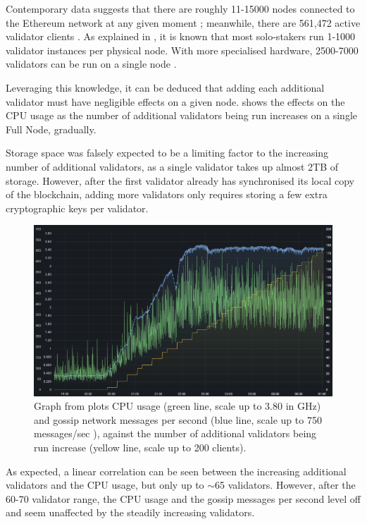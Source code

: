 Contemporary data suggests that there are roughly 11-15000 nodes connected to the Ethereum network at any given moment \cite{NodewatchAnalytics}; meanwhile, there are 561,472 active validator clients \cite{EthereumEthereum.orgc}. As explained in , it is known that most solo-stakers run 1-1000 validator instances per physical node. With more specialised hardware, 2500-7000 validators can be run on a single node \cite{Kaushal2022ValidatingConference}. 

Leveraging this knowledge, it can be deduced that adding each additional validator must have negligible effects on a given node.  shows the effects on the CPU usage as the number of additional validators being run increases on a single Full Node, gradually.

Storage space was falsely expected to be a limiting factor to the increasing number of additional validators, as a single validator takes up almost 2TB of storage. However, after the first validator already has synchronised its local copy of the blockchain, adding more validators only requires storing a few extra cryptographic keys per validator.

\begin{figure}[htb!]
    \centering
    \includegraphics[width=15cm,center]{Figures/cpuValidatorsGossip.png}
    \caption{Graph from \cite{Sutton2022ExploringSymphonious} plots CPU usage (green line, scale up to 3.80 in GHz) and gossip network messages per second (blue line, scale up to 750 messages/sec ), against the number of additional validators being run increase (yellow line, scale up to 200 clients).}
    \label{Figure:validatorIncrease}
\end{figure}

As expected, a linear correlation can be seen between the increasing additional validators and the CPU usage, but only up to $\sim$65 validators. However, after the 60-70 validator range, the CPU usage and the gossip messages per second level off and seem unaffected by the steadily increasing validators. 

